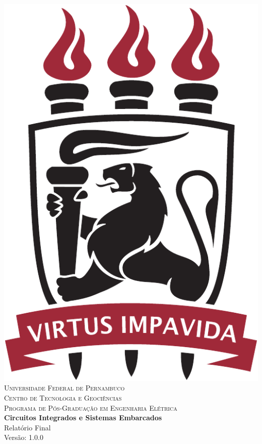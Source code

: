 \documentclass[
	12pt,				%
	openright,			%
  oneside,     %
	a4paper,			%
	english,			%
	french,				%
	spanish,			%
	brazil				%
	]{abntex2}
\begin{document}


\begin{center} 
\includegraphics[scale=0.25]{images/ufpelogo.pdf} \\

{\scshape Universidade Federal de Pernambuco\\}
{\scshape Centro de Tecnologia e Geociências\\}
{\scshape Programa de Pós-Graduação em Engenharia Elétrica\\}
\vfill
        {{\Large \textbf{Circuitos Integrados e Sistemas Embarcados}}}\\
        \vspace{.5cm}
        {{\Large Relatório Final}}\\
        \vspace{1cm}
        {{\large Versão: 1.0.0}}\\
        \vfill


\end{center}
\end{document}
